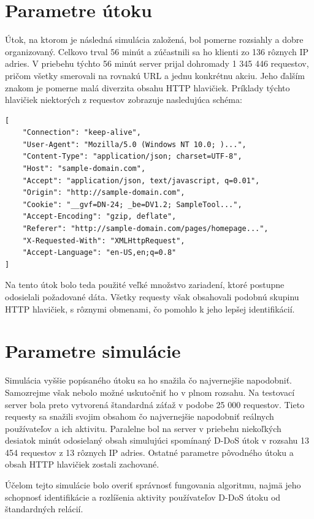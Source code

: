 \documentclass[
  printed, %
  table,   %
  lof,     %
  nolot,   %
  nocover
]{fithesis3}
\begin{document}
\section{Parametre útoku}
Útok, na ktorom je následná simulácia založená, bol pomerne rozsiahly a dobre
organizovaný. Celkovo trval 56 minút a zúčastnili sa ho klienti zo 136 rôznych
IP adries. V priebehu týchto 56 minút server prijal dohromady 1 345 446 requestov, pričom
všetky smerovali na rovnakú URL a jednu konkrétnu akciu. Jeho ďalším znakom je
pomerne malá diverzita obsahu HTTP hlavičiek. Príklady týchto hlavičiek
niektorých z requestov zobrazuje nasledujúca schéma: 

\begin{lstlisting}[basicstyle=\footnotesize, mathescape=true]
[
    "Connection": "keep-alive",
    "User-Agent": "Mozilla/5.0 (Windows NT 10.0; )...",
    "Content-Type": "application/json; charset=UTF-8",
    "Host": "sample-domain.com",
    "Accept": "application/json, text/javascript, q=0.01",
    "Origin": "http://sample-domain.com",
    "Cookie": "__gvf=DN-24; _be=DV1.2; SampleTool...",
    "Accept-Encoding": "gzip, deflate",
    "Referer": "http://sample-domain.com/pages/homepage...",
    "X-Requested-With": "XMLHttpRequest",
    "Accept-Language": "en-US,en;q=0.8"
]
\end{lstlisting}

Na tento útok bolo teda použité veľké množstvo zariadení, ktoré postupne
odosielali požadované dáta. Všetky requesty však obsahovali podobnú skupinu
HTTP hlavičiek, s rôznymi obmenami, čo pomohlo k jeho lepšej identifikácií.

\section{Parametre simulácie}
Simulácia vyššie popísaného útoku sa ho snažila čo najvernejšie napodobniť.
Samozrejme však nebolo možné uskutočniť ho v plnom rozsahu. Na testovací server
bola preto vytvorená štandardná záťaž v podobe 25 000 requestov. Tieto requesty
sa snažili svojim obsahom čo najvernejšie napodobniť reálnych používateľov a
ich aktivitu. Paralelne bol na server  v priebehu niekoľkých desiatok minút
odosielaný obsah simulujúci spomínaný D-DoS útok v rozsahu 13 454 requestov z
13 rôznych IP adries. Ostatné parametre pôvodného útoku a obsah HTTP hlavičiek
zostali zachované.

Účelom tejto simulácie bolo overiť správnosť fungovania algoritmu, najmä jeho
schopnosť identifikácie a rozlíšenia aktivity používateľov D-DoS útoku od
štandardných relácií.
\end{document}
